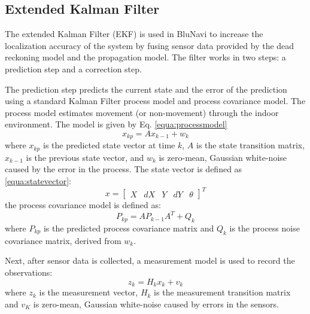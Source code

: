 \documentclass[conference]{IEEEtran}
\begin{document}
\subsection{Extended Kalman Filter}
The extended Kalman Filter (EKF) is used in BluNavi to increase the localization accuracy of the system by fusing sensor data provided by the dead reckoning model and the propagation model. The filter works in two steps: a prediction step and a correction step.

The prediction step predicts the current state and the error of the prediction using a standard Kalman Filter process model and process covariance model. The process model estimates movement (or non-movement) through the indoor environment. The model is given by Eq. \ref{equa:processmodel}
\begin{equation}
\label{equa:processmodel}
x_{kp} = Ax_{k-1} + w_k
\end{equation}
where $x_{kp}$ is the predicted state vector at time $k$, $A$ is the state transition matrix, $x_{k-1}$ is the previous state vector, and $w_k$ is zero-mean, Gaussian white-noise caused by the error in the process. The state vector is defined as \ref{equa:statevector}:
\begin{equation}
\label{equa:statevector}
x =
\begin{bmatrix}
  X & dX & Y & dY & \theta
\end{bmatrix}^T
\end{equation}
the process covariance model is defined as:
\begin{equation}
P_{kp} = AP_{k-1}A^T + Q_k
\end{equation}
where $P_{kp}$ is the predicted process covariance matrix and $Q_k$ is the process noise covariance matrix, derived from $w_k$.

Next, after sensor data is collected, a measurement model is used to record the observations:
\begin{equation}
z_k = H_kx_{k} + v_k
\end{equation}
where $z_k$ is the measurement vector, $H_k$ is the measurement transition matrix and $v_K$ is zero-mean, Gaussian white-noise caused by errors in the sensors.
\end{document}
